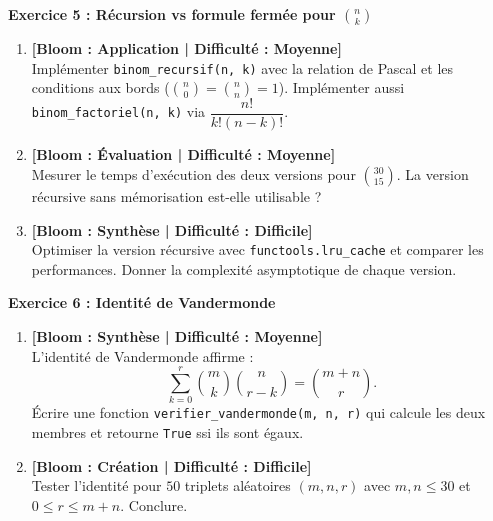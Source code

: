 \noindent\textbf{Exercice 5 : Récursion vs formule fermée pour $\binom{n}{k}$}
\begin{enumerate}
    \item \textbf{[Bloom : Application | Difficulté : Moyenne]} \\
    Implémenter \texttt{binom\_recursif(n, k)} avec la relation de Pascal et les conditions aux bords ($\binom{n}{0} = \binom{n}{n} = 1$). Implémenter aussi \texttt{binom\_factoriel(n, k)} via $\dfrac{n!}{k!(n-k)!}$.
    \item \textbf{[Bloom : Évaluation | Difficulté : Moyenne]} \\
    Mesurer le temps d'exécution des deux versions pour $\binom{30}{15}$. La version récursive sans mémorisation est-elle utilisable ?
    \item \textbf{[Bloom : Synthèse | Difficulté : Difficile]} \\
    Optimiser la version récursive avec \texttt{functools.lru\_cache} et comparer les performances. Donner la complexité asymptotique de chaque version.
\end{enumerate}

\vspace{0.3cm}

\noindent\textbf{Exercice 6 : Identité de Vandermonde}
\begin{enumerate}
    \item \textbf{[Bloom : Synthèse | Difficulté : Moyenne]} \\
    L'identité de Vandermonde affirme :
    \[ \sum_{k=0}^{r} \binom{m}{k} \binom{n}{r-k} = \binom{m+n}{r}. \]
    Écrire une fonction \texttt{verifier\_vandermonde(m, n, r)} qui calcule les deux membres et retourne \texttt{True} ssi ils sont égaux.
    \item \textbf{[Bloom : Création | Difficulté : Difficile]} \\
    Tester l'identité pour $50$ triplets aléatoires $(m, n, r)$ avec $m, n \le 30$ et $0 \le r \le m+n$. Conclure.
\end{enumerate}

\vspace{0.3cm}

